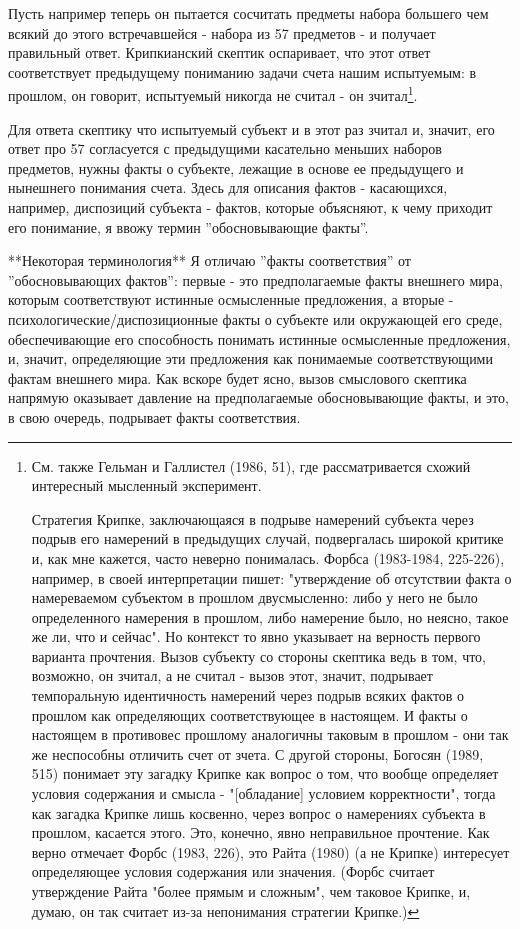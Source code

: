 \documentclass{book}
\begin{document}
Пусть например теперь он пытается сосчитать предметы набора большего чем всякий до этого встречавшейся - набора из 57 предметов - и получает правильный ответ. Крипкианский скептик оспаривает, что этот ответ соответствует предыдущему пониманию задачи счета нашим испытуемым: в прошлом, он говорит, испытуемый никогда не считал - он зчитал\footnote{См. также Гельман и Галлистел (1986, 51), где рассматривается схожий интересный мысленный эксперимент.

Стратегия Крипке, заключающаяся в подрыве намерений субъекта через подрыв его намерений в предыдущих случай, подвергалась широкой критике и, как мне кажется, часто неверно понималась. Форбса (1983-1984, 225-226), например, в своей интерпретации пишет: "утверждение об отсутствии факта о намереваемом субъектом в прошлом двусмысленно: либо у него не было определенного намерения в прошлом, либо намерение было, но неясно, такое же ли, что и сейчас". Но контекст то явно указывает на верность первого варианта прочтения. Вызов субъекту со стороны скептика ведь в том, что, возможно, он зчитал, а не считал - вызов этот, значит, подрывает темпоральную идентичность намерений через подрыв всяких фактов о прошлом как определяющих соответствующее в настоящем. И факты о настоящем в противовес прошлому аналогичны таковым в прошлом - они так же неспособны отличить счет от зчета. С другой стороны, Богосян (1989, 515) понимает эту загадку Крипке как вопрос о том, что вообще определяет условия содержания и смысла - "[обладание] условием корректности", тогда как загадка Крипке лишь косвенно, через вопрос о намерениях субъекта в прошлом, касается этого. Это, конечно, явно неправильное прочтение. Как верно отмечает Форбс (1983, 226), это Райта (1980) (а не Крипке) интересует определяющее условия содержания или значения. (Форбс считает утверждение Райта "более прямым и сложным", чем таковое Крипке, и, думаю, он так считает из-за непонимания стратегии Крипке.)}.

Для ответа скептику что испытуемый субъект и в этот раз зчитал и, значит, его ответ про 57 согласуется с предыдущими касательно меньших наборов предметов, нужны факты о субъекте, лежащие в основе ее предыдущего и нынешнего понимания счета. Здесь для описания фактов - касающихся, например, диспозиций субъекта - фактов, которые объясняют, к чему приходит его понимание, я ввожу термин ''обосновывающие факты''.

**Некоторая терминология** Я отличаю ''факты соответствия'' от ''обосновывающих фактов'': первые - это предполагаемые факты внешнего мира, которым соответствуют истинные осмысленные предложения, а вторые - психологические/диспозиционные факты о субъекте или окружающей его среде, обеспечивающие его способность понимать истинные осмысленные предложения, и, значит, определяющие эти предложения как понимаемые соответствующими фактам внешнего мира. Как вскоре будет ясно, вызов смыслового скептика напрямую оказывает давление на предполагаемые обосновывающие факты, и это, в свою очередь, подрывает факты соответствия.
\end{document}
